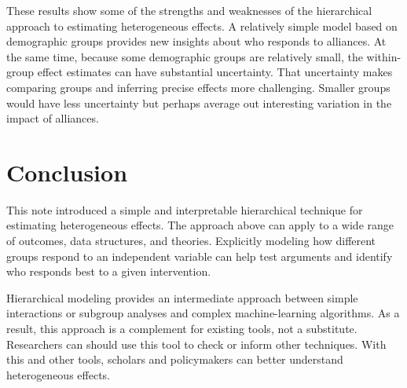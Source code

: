 \documentclass[12pt]{article}
\begin{document}
These results show some of the strengths and weaknesses of the hierarchical approach to estimating heterogeneous effects. 
A relatively simple model based on demographic groups provides new insights about who responds to alliances. 
At the same time, because some demographic groups are relatively small, the within-group effect estimates can have substantial uncertainty. 
That uncertainty makes comparing groups and inferring precise effects more challenging. 
Smaller groups would have less uncertainty but perhaps average out interesting variation in the impact of alliances. 


\section{Conclusion}

This note introduced a simple and interpretable hierarchical technique for estimating heterogeneous effects. 
The approach above can apply to a wide range of outcomes, data structures, and theories. 
Explicitly modeling how different groups respond to an independent variable can help test arguments and identify who responds best to a given intervention. 


Hierarchical modeling provides an intermediate approach between simple interactions or subgroup analyses and complex machine-learning algorithms. 
As a result, this approach is a complement for existing tools, not a substitute. 
Researchers can should use this tool to check or inform other techniques.
With this and other tools, scholars and policymakers can better understand heterogeneous effects.


\singlespace
 
 
\end{document}
